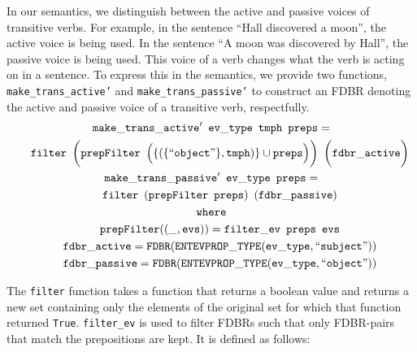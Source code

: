 \documentclass[../main.tex]{subfiles}
\begin{document}
In our semantics, we distinguish between the active and passive voices of transitive verbs.  For example, in the sentence ``Hall discovered a moon'', the active voice is being used.
In the sentence ``A moon was discovered by Hall'', the passive voice is being
used.  This voice of a verb changes what the verb is acting on in  a sentence.  To express this in the semantics,
we provide two functions, \texttt{make\_trans\_active'} and \texttt{make\_trans\_passive'} to construct an FDBR denoting the active and passive voice of a transitive verb, respectfully.\\
{\setlength{\mathindent}{0cm}
\begin{gather*}
\mathtt{make\_trans\_active'}\enspace \mathtt{ev\_type}\enspace \mathtt{tmph}\enspace \mathtt{preps} = \\
	\mathtt{\indent filter}\enspace \bigg(\mathtt{prepFilter}\enspace \Big(\{(\{\text{``\texttt{object}''}\}, \mathtt{tmph})\} \cup \mathtt{preps}\Big)\bigg)\enspace \bigg(\mathtt{fdbr\_active}\bigg) \\
\mathtt{make\_trans\_passive'}\enspace \mathtt{ev\_type}\enspace \mathtt{preps} = \\
	\mathtt{\indent filter}\enspace (\mathtt{prepFilter}\enspace \mathtt{preps})\enspace (\mathtt{fdbr\_passive}) \\
\mathtt{ where} \\
\mathtt{\indent prepFilter} ((\_, \mathtt{evs})) = \mathtt{filter\_ev}\enspace \mathtt{preps}\enspace \mathtt{evs} \\
\mathtt{\indent fdbr\_active} = \mathtt{FDBR}(\mathtt{ENTEVPROP\_TYPE}(\mathtt{ev\_type}, \text{``\texttt{subject}''})) \\
\mathtt{\indent fdbr\_passive} = \mathtt{FDBR}(\mathtt{ENTEVPROP\_TYPE}(\mathtt{ev\_type}, \text{``\texttt{object}''}))
\end{gather*}
}

The \texttt{filter} function takes a function that returns a boolean value and returns a new set containing only the elements of the original set for which that function returned \texttt{True}.
\texttt{filter\_ev} is used to filter FDBRs such that only FDBR-pairs that match
the prepositions are kept. It is defined as follows:\\
\end{document}
